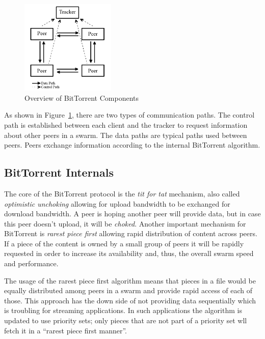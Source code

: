 \begin{figure}[htb]
  \begin{center}
    \includegraphics[width=0.4\textwidth]{src/img/p2p-systems/bittorrent-overview}
  \end{center}
  \caption{Overview of BitTorrent Components}
  \label{fig:p2p-systems:bittorrent-overview}
\end{figure}

As shown in Figure~\ref{fig:p2p-systems:bittorrent-overview}, there are two
types of communication paths. The control path is established between each
client and the tracker to request information about other peers in a swarm.
The data paths are typical paths used between peers. Peers exchange
information according to the internal BitTorrent algorithm.

\subsection{BitTorrent Internals}

The core of the BitTorrent protocol is the \textit{tit for tat} mechanism,
also called \textit{optimistic unchoking} allowing for upload bandwidth to be
exchanged for download bandwidth. A peer is hoping another peer will provide
data, but in case this peer doesn't upload, it will be \textit{choked}.
Another important mechanism for BitTorrent is \textit{rarest piece first}
allowing rapid distribution of content across peers. If a piece of the content
is owned by a small group of peers it will be rapidly requested in order to
increase its availability and, thus, the overall swarm speed and performance.

The usage of the rarest piece first algorithm means that pieces in a file
would be equally distributed among peers in a swarm and provide rapid access
of each of those. This approach has the down side of not providing data
sequentially which is troubling for streaming applications. In such
applications the algorithm is updated to use priority sets; only pieces
that are not part of a priority set wll fetch it in a ``rarest piece first
manner''.

